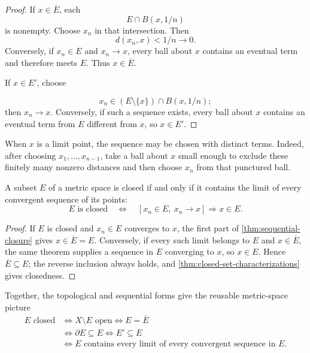 \begin{proof}
If $x\in\overline E$, each
\[
E\cap B(x,1/n)
\]
 is nonempty. Choose $x_n$
in that intersection. Then
\[
d(x_n,x)<1/n\to0.
\]
 Conversely, if $x_n\in E$
and $x_n\to x$, every ball about $x$ contains an eventual term and therefore
meets $E$. Thus $x\in\overline E$.

If $x\in E'$, choose

\[
x_n\in(E\setminus\{x\})\cap B(x,1/n);
\]
 then $x_n\to x$. Conversely,
if such a sequence exists, every ball about $x$ contains an eventual term
from $E$ different from $x$, so $x\in E'$.
\end{proof}
When $x$ is a limit point, the sequence may be chosen with distinct terms.
Indeed, after choosing $x_1,\ldots,x_{n-1}$, take a ball about $x$ small
enough to exclude these finitely many nonzero distances and then choose
$x_n$ from that punctured ball.

\begin{theorem}
\label{thm:sequential-closed-sets}
A subset $E$ of a metric space is closed if and only if it contains the
limit of every convergent sequence of its points:
\[
\boxed{
E\text{ is closed}
\quad\Longleftrightarrow\quad
[x_n\in E,\ x_n\to x]\Longrightarrow x\in E.
}
\]
\end{theorem}
\begin{proof}
If $E$ is closed and $x_n\in E$ converges to $x$, the first part of
\cref{thm:sequential-closure} gives $x\in\overline E=E$. Conversely,
if every such limit belongs to $E$ and $x\in\overline E$, the same theorem
supplies a sequence in $E$ converging to $x$, so $x\in E$. Hence
$\overline E\subseteq E$; the reverse inclusion always holds, and
\cref{thm:closed-set-characterizations} gives closedness.
\end{proof}
Together, the topological and sequential forms give the reusable metric-space
picture
\[
\boxed{
\begin{aligned}
E\text{ closed}
&\Longleftrightarrow X\setminus E\text{ open}
\Longleftrightarrow E=\overline E\\
&\Longleftrightarrow \partial E\subseteq E
\Longleftrightarrow E'\subseteq E\\
&\Longleftrightarrow E\text{ contains every limit of every convergent
sequence in }E.
\end{aligned}}
\]

